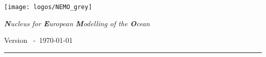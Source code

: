 
\begin{titlepage}
  \setlength{\parindent}{0pt}

  \begin{center}
    \begin{minipage}{0.3\textwidth}
      \texttt{[image: logos/NEMO\_grey]}
    \end{minipage}\begin{minipage}{0.6\textwidth}
      \begin{center}
      \Large\slshape
      \textbf{N}ucleus for \textbf{E}uropean \textbf{M}odelling of the \textbf{O}cean \\
      \medskip
      \hyperref[resources]{\textcolor{black}{
          \faWordpress \hspace{0.75cm} \faCodeFork      \hspace{0.75cm}
          \faGithub    \hspace{0.75cm} \faCloudDownload \hspace{0.75cm} \faEnvelope
        }
      }
      \end{center}
    \end{minipage}
  \end{center}

  \spacetop
  \textcolor{white}{\fontsize{0.8cm}{0.8cm}\selectfont\textbf{\heading}}
  \ifdef{\subheading}{
    \medskip
    \par
    \textcolor{white}{\Huge \subheading}
  }{}
  \spacedown

  \begin{center}
    \LARGE Version \version\ -\ \today \\
  \end{center}

  \vfill

  \begin{minipage}{\authorswidth}
    \raggedleft
    
  \end{minipage}\hspace{15pt}\begin{minipage}{0.02\linewidth}
    \rule{1pt}{}
  \end{minipage}\hspace{ 5pt}\begin{minipage}{\abstractwidth}
    \begin{abstract}
      
    \end{abstract}
  \end{minipage}


\end{titlepage}
